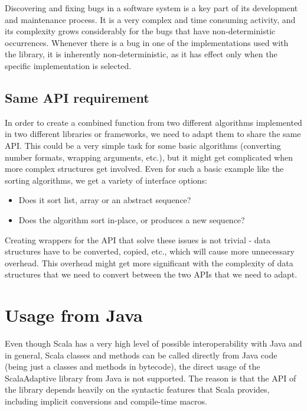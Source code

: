 Discovering and fixing bugs in a software system is a key part of its development and maintenance process. It is a very complex and time consuming activity, and its complexity grows considerably for the bugs that have non-deterministic occurrences. Whenever there is a bug in one of the implementations used with the library, it is inherently non-deterministic, as it has effect only when the specific implementation is selected.

\subsection{Same API requirement}

In order to create a combined function from two different algorithms implemented in two different libraries or frameworks, we need to adapt them to share the same API. This could be a very simple task for some basic algorithms (converting number formats, wrapping arguments, etc.), but it might get complicated when more complex structures get involved. Even for such a basic example like the sorting algorithms, we get a variety of interface options:

\begin{itemize}
	\item Does it sort list, array or an abstract sequence?
	\item Does the algorithm sort in-place, or produces a new sequence?
\end{itemize}

Creating wrappers for the API that solve these issues is not trivial - data structures have to be converted, copied, etc., which will cause more unnecessary overhead. This overhead might get more significant with the complexity of data structures that we need to convert between the two APIs that we need to adapt.

\section{Usage from Java}

Even though Scala has a very high level of possible interoperability with Java and in general, Scala classes and methods can be called directly from Java code (being just a classes and methods in bytecode), the direct usage of the ScalaAdaptive library from Java is not supported. The reason is that the API of the library depends heavily on the syntactic features that Scala provides, including implicit conversions and compile-time macros.

